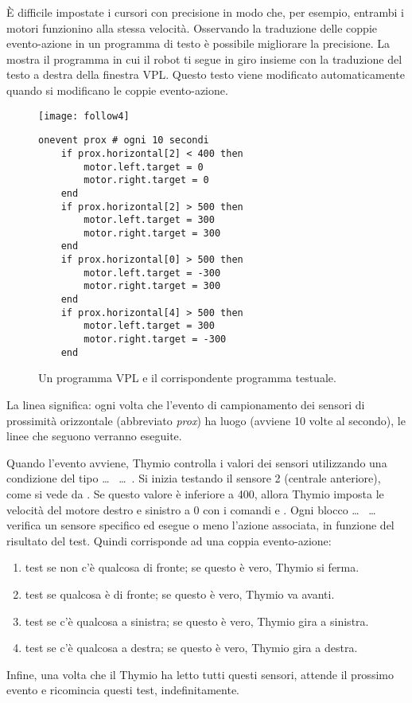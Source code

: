 È difficile impostate i cursori con precisione in modo che, per esempio, entrambi i
motori funzionino alla stessa velocità. Osservando la traduzione delle
coppie evento-azione in un programma di testo è possibile migliorare la precisione.
La  mostra il programma in cui il robot ti segue in giro insieme con la traduzione del testo a destra della finestra VPL.
Questo testo viene modificato automaticamente quando si modificano le coppie evento-azione.

\begin{figure}
\texttt{[image: follow4]}
\hfill
\begin{minipage}[b]{0.6\textwidth}
\footnotesize
\begin{lstlisting}
onevent prox # ogni 10 secondi
	if prox.horizontal[2] < 400 then
		motor.left.target = 0
		motor.right.target = 0
	end
	if prox.horizontal[2] > 500 then
		motor.left.target = 300
		motor.right.target = 300
	end
	if prox.horizontal[0] > 500 then
		motor.left.target = -300
		motor.right.target = 300
	end
	if prox.horizontal[4] > 500 then
		motor.left.target = 300
		motor.right.target = -300
	end
\end{lstlisting}
\end{minipage}
\caption{Un programma VPL e il corrispondente programma testuale.}
\label{fig.textcode}
\end{figure}

La linea  significa: ogni volta che l'evento di campionamento dei sensori di prossimità orizzontale (abbreviato \emph{prox}) ha luogo (avviene 10 volte al secondo), le linee che seguono verranno eseguite.

Quando l'evento avviene, Thymio controlla i valori dei sensori utilizzando una condizione del tipo  \ldots \  \ldots \ .
Si inizia testando il sensore 2 (centrale anteriore), come si vede da .
Se questo valore è inferiore a 400, allora Thymio imposta le velocità del motore destro e sinistro a 0 con i comandi 
 e .
Ogni blocco  \ldots \  \ldots \  verifica un sensore specifico ed esegue o meno l'azione associata, in funzione del risultato del test.
Quindi corrisponde ad una coppia evento-azione:
\begin{enumerate}[start=0,noitemsep,nosep]
\item test se non c'è qualcosa di fronte; se questo è vero, Thymio si ferma.
\item test se qualcosa è di fronte; se questo è vero, Thymio va avanti.
\item test se c'è qualcosa a sinistra; se questo è vero, Thymio gira a sinistra.
\item test se c'è qualcosa a destra; se questo è vero, Thymio gira a destra.
\end{enumerate}
Infine, una volta che il Thymio ha letto tutti questi sensori, attende il prossimo evento   e ricomincia questi test, indefinitamente.

